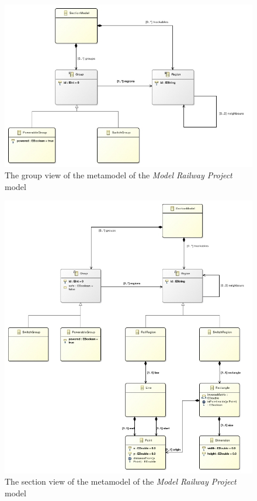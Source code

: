 \begin{figure}[H]
	\hspace*{-1in}
	\centering
	\includegraphics[width=1.2\linewidth]{include/figures/chapter_6/metamodels/groupmodel}
	\caption{The group view of the metamodel of the \emph{Model Railway Project} model} 
	\label{fig:case_study:groupmodel}
\end{figure}
\newpage
\begin{figure}[H]
	\centering
	\includegraphics[width=1.2\linewidth]{include/figures/chapter_6/metamodels/sectionmodel}
	\caption{The section view of the metamodel of the \emph{Model Railway Project} model} 
	\label{fig:case_study:sectionmodel}
\end{figure}
